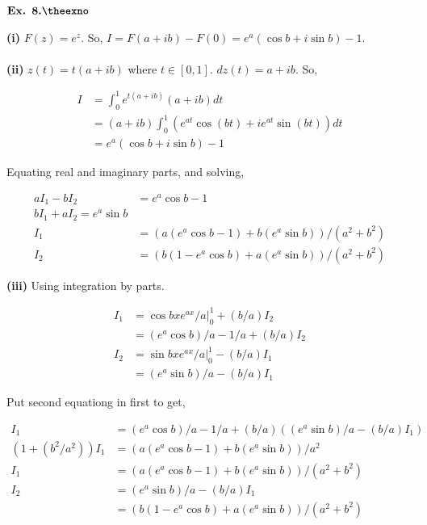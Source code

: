 \documentclass{article}
\def\tf{\textbf}
\newcounter{exno}
\begin{document}
\vspace{0.2in}

${\textbf{Ex. 8.\theexno}}$\addtocounter{exno}{1}

\tf{(i)} $F(z) = e^z$. So, $I=F(a+ib)-F(0) = e^a(\cos b + i \sin b) - 1$.\\~\\

\tf{(ii)} $z(t) = t(a+ib)$ where $t \in [0,1]$. $dz(t) = a+ib$. So,

\begin{align*}
    I &= \int_{0}^{1}e^{t(a+ib)}(a+ib)dt\\
    &= (a+ib)\int_{0}^{1}(e^{at}\cos(bt) + i e^{at}\sin(bt))dt\\
    &= e^{a}(\cos b + i\sin b) - 1
\end{align*}

Equating real and imaginary parts, and solving,

\begin{align*}
    aI_1 -bI_2 &= e^a\cos b - 1\\
    bI_1 + aI_2 = e^a\sin b\\
    I_1 &= (a(e^a\cos b - 1) + b(e^a\sin b))/(a^2+b^2)\\
    I_2 &= (b(1-e^a\cos b) + a(e^a\sin b))/(a^2+b^2)
\end{align*}

\tf{(iii)} Using integration by parts.

\begin{align*}
    I_1 &= \cos bx e^{ax}/a|_{0}^{1} + (b/a) I_2\\
    &= (e^a\cos b)/a - 1/a + (b/a)I_2\\
    I_2 &= \sin bx e^{ax}/a|_{0}^{1} - (b/a)I_1\\
    &= (e^{a}\sin b)/a - (b/a)I_1
\end{align*}

Put second equationg in first to get,

\begin{align*}
    I_1 &= (e^a\cos b)/a - 1/a + (b/a)((e^{a}\sin b)/a - (b/a)I_1)\\
    (1+(b^2/a^2))I_1 &= (a(e^a\cos b - 1) + b(e^a\sin b))/a^2\\
    I_1 &= (a(e^a\cos b - 1) + b(e^a\sin b))/(a^2+b^2)\\
    I_2 &= (e^{a}\sin b)/a - (b/a)I_1\\
    &= (b(1-e^a\cos b) + a(e^a\sin b))/(a^2+b^2)
\end{align*}
\end{document}
